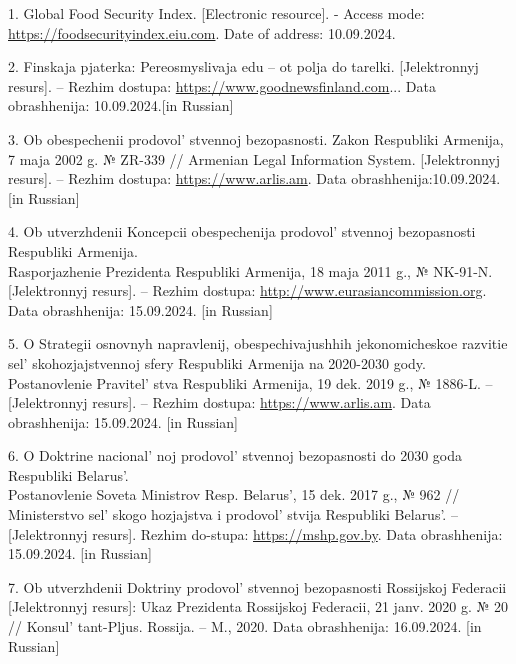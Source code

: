 \begin{references}
1. Global Food Security Index. {[}Electronic resource{]}. - Access mode:
\href{https://foodsecurityindex.eiu.com/Index}{https://foodsecurityindex.eiu.com}. Date of address: 10.09.2024.

2. Finskaja pjaterka: Pereosmyslivaja edu -- ot polja do tarelki.
{[}Jelektronnyj resurs{]}. -- Rezhim dostupa:
\href{https://www.goodnewsfinland.com/ru/feature/finskaya-pyaterka-pereosmyslivaya-edu-ot-polya-do-tarelki}{https://www.goodnewsfinland.com}...
Data obrashhenija: 10.09.2024.{[}in Russian{]}

3. Ob obespechenii prodovol' stvennoj bezopasnosti. Zakon
Respubliki Armenija, 7 maja 2002 g. № ZR-339 // Armenian Legal
Information System. {[}Jelektronnyj resurs{]}. -- Rezhim dostupa:
\href{https://www.arlis.am/DocumentView.aspx?docid=63049}{https://www.arlis.am}. Data
obrashhenija:10.09.2024.{[}in Russian{]}

4. Ob utverzhdenii Koncepcii obespechenija
prodovol' stvennoj bezopasnosti Respubliki Armenija.\\
Rasporjazhenie Prezidenta Respubliki Armenija, 18 maja 2011 g., №
NK-91-N. {[}Jelektronnyj resurs{]}. -- Rezhim dostupa:
\href{http://www.eurasiancommission.org/ru/act/prom\_i\_agroprom/dep\_agroprom/Pages/National-production-plans.aspx}{http://www.eurasiancommission.org}. Data obrashhenija: 15.09.2024. {[}in
Russian{]}

5. O Strategii osnovnyh napravlenij, obespechivajushhih jekonomicheskoe
razvitie sel' skohozjajstvennoj sfery Respubliki Armenija
na 2020-2030 gody. Postanovlenie Pravitel' stva
Respubliki Armenija, 19 dek. 2019 g., № 1886-L. -- {[}Jelektronnyj
resurs{]}. -- Rezhim dostupa: \href{https://www.arlis.am/DocumentView.aspx?DocID=137852}{https://www.arlis.am}. Data obrashhenija: 15.09.2024. {[}in
Russian{]}

6. O Doktrine nacional' noj
prodovol' stvennoj bezopasnosti do 2030 goda Respubliki
Belarus'. \\Postanovlenie Soveta Ministrov Resp.
Belarus', 15 dek. 2017 g., № 962 // Ministerstvo
sel' skogo hozjajstva i prodovol' stvija
Respubliki Belarus'. -- {[}Jelektronnyj resurs{]}. Rezhim
do-stupa: \href{https://mshp.gov.by/documents/plant/dccea377014340f4.html}{https://mshp.gov.by}.
Data obrashhenija: 15.09.2024. {[}in Russian{]}

7. Ob utverzhdenii Doktriny prodovol' stvennoj
bezopasnosti Rossijskoj Federacii {[}Jelektronnyj resurs{]}: Ukaz
Prezidenta Rossijskoj Federacii, 21 janv. 2020 g. № 20 //
Konsul' tant-Pljus. Rossija. -- M., 2020. Data
obrashhenija: 16.09.2024. {[}in Russian{]}


\end{references}
